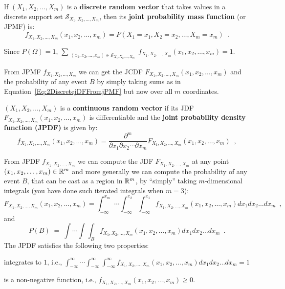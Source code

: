 \begin{definition}
If $(X_1,X_2,\ldots,X_m)$ is a {\bf discrete random vector} that takes values in a discrete support set $\mathcal{S}_{X_1,X_2,\ldots,X_m}$, then its \textbf{joint probability mass function} (or JPMF) is:
\begin{equation}\label{Eq:jmDPMF}
f_{X_1,X_2,\ldots,X_m}(x_1,x_2,\ldots,x_m) = P(X_1=x_1,X_2=x_2,\ldots,X_m=x_m) \enspace . 
\end{equation}
\end{definition}
Since $P(\Omega)=1$, $\sum_{{\substack{(x_1,x_2,\ldots,x_m) \in \mathcal{S}_{X_1,X_2,\ldots,X_m}}}}f_{X_1,X_2,\ldots,X_m}(x_1,x_2,\ldots,x_m)=1$.

From JPMF $f_{X_1,X_2,\ldots,X_m}$ we can get the JCDF $F_{X_1,X_2,\ldots,X_m}(x_1,x_2,\ldots,x_m)$ and the probability of any event $B$ by simply taking sums as in Equation~\eqref{Eq:2DiscretejDFFromjPMF} but now over all $m$ coordinates.

\begin{definition}
$(X_1,X_2,\ldots,X_m)$ is a {\bf continuous random vector} if its JDF $F_{X_1,X_2,\ldots,X_m}(x_1,x_2,\ldots,x_m)$ is differentiable and the {\bf joint probability density function (JPDF)} is given by:
\[
f_{X_1,X_2,\ldots,X_m}(x_1,x_2,\ldots,x_m) = \frac{\partial^m}{\partial x_1 \partial x_2 \cdots \partial x_m} F_{X_1,X_2,\ldots,X_m}(x_1,x_2,\ldots,x_m) \enspace ,
\]
\end{definition}

From JPDF $f_{X_1,X_2,\ldots,X_m}$ we can compute the JDF $F_{X_1,X_2,\ldots,X_m}$ at any point $(x_1,x_2,\ldots,x_m) \in \mathbb{R}^m$ and more generally we can compute the probability of any event $B$, that can be cast as a region in $\mathbb{R}^m$, by ``simply'' taking $m$-dimensional integrals (you have done such iterated integrals when $m=3$):
\begin{equation}\label{Eq:mContjDFFromjPDF}
\boxed{F_{X_1,X_2,\ldots,X_m}(x_1,x_2,\ldots,x_m) = \int_{-\infty}^{x_m} \cdots \int_{-\infty}^{x_2} \int_{-\infty}^{x_1} f_{X_1,X_2,\ldots,X_m}(x_1,x_2,\ldots,x_m) dx_1 dx_2\ldots d x_m}\enspace ,
\end{equation}
and
\begin{equation}\label{Eq:mContProbEventFromjPDF}
\boxed{P(B)\;=\; \int\cdots\int\int_{B} f_{X_1,X_2,\ldots,X_m}(x_1,x_2,\ldots,x_m) dx_1 dx_2\ldots d x_m}\enspace .
\end{equation}
The JPDF satisfies the following two properties:
\be
\item integrates to $1$, i.e., $\int_{-\infty}^{\infty} \cdots \int_{-\infty}^{\infty}\int_{-\infty}^{\infty} f_{X_1,X_2,\ldots,X_m}(x_1,x_2,\ldots,x_m) dx_1 dx_2\ldots d x_m=1$
\item is a non-negative function, i.e., $f_{X_1,X_2,\ldots,X_m}(x_1,x_2,\ldots,x_m) \geq 0$.
\ee

